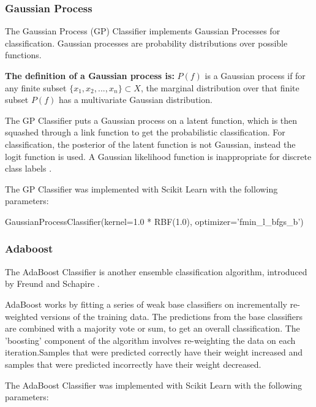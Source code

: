 \subsubsection*{Gaussian Process}

The Gaussian Process (GP) Classifier implements Gaussian Processes for classification. Gaussian processes are probability distributions over possible functions.

\textbf{The definition of a Gaussian process is:} $P(f)$ is a Gaussian process if for any finite subset $\{x_1,x_2,...,x_n\} \subset X$, the marginal distribution over that finite subset $P(f)$ has a multivariate Gaussian distribution.

The GP Classifier puts a Gaussian process on a latent function, which is then squashed through a link function to get the probabilistic classification. For classification, the posterior of the latent function is not Gaussian, instead the logit function is used. A Gaussian likelihood function is inappropriate for discrete class labels \cite{gaussianProcesses2006}.

The GP Classifier was implemented with Scikit Learn with the following parameters:

\begin{tcolorbox}
\begin{center}
	GaussianProcessClassifier(kernel=1.0 * RBF(1.0), optimizer='fmin\_l\_bfgs\_b')
\end{center}
\end{tcolorbox}

\subsubsection*{Adaboost}

The AdaBoost Classifier is another ensemble classification algorithm, introduced by Freund and Schapire \cite{adaboost1997}.

AdaBoost works by fitting a series of weak base classifiers on incrementally re-weighted versions of the training data. The predictions from the base classifiers are combined with a majority vote or sum, to get an overall classification. The 'boosting' component of the algorithm involves re-weighting the data on each iteration.Samples that were predicted correctly have their weight increased and samples that were predicted incorrectly have their weight decreased.

The AdaBoost Classifier was implemented with Scikit Learn with the following parameters:

